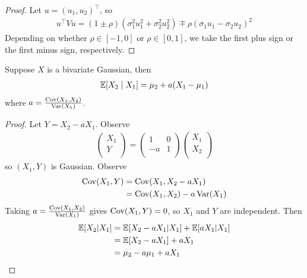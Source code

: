 \documentclass{../../template/note}
\begin{document}
    \begin{proof}
        Let \(u = (u_1, u_2)^\intercal\), so
        \begin{align*}
            u^\intercal V u = (1 \pm \rho)(\sigma_1^2 u_1^2 + \sigma_2^2 u_2^2) \mp \rho(\sigma_1 u_1 - \sigma_2 u_2)^2
        \end{align*}
        Depending on whether \(\rho \in [-1, 0]\) or \(\rho \in [0, 1]\), we take the first plus sign or the first minus sign, respectively.       
    \end{proof}

    \begin{proposition}
        Suppose \(X\) is a bivariate Gaussian, then
        \begin{align*}
            \mathbb E[X_2 \mid X_1] = \mu_2 + a(X_1 - \mu_1)
        \end{align*}
        where \(a = \frac{\operatorname{Cov}(X_1, X_2)}{\operatorname{Var}(X_1)}\).        
    \end{proposition}

    \begin{proof}
        Let \(Y = X_2 - aX_1\). Observe
        \begin{align*}
            \begin{pmatrix}
                X_1 \\
                Y \\
            \end{pmatrix} = \begin{pmatrix}
                1 & 0 \\
                -a & 1 \\
            \end{pmatrix}\begin{pmatrix}
                X_1 \\
                X_2 \\
            \end{pmatrix} 
        \end{align*}
        so \((X_1, Y)\) is Gaussian. Observe
        \begin{align*}
            \operatorname{Cov}(X_1, Y) &= \operatorname{Cov}(X_1, X_2 - aX_1) \\
            &= \operatorname{Cov}(X_1, X_2) - a\operatorname{Var}(X_1)
        \end{align*}
        Taking \(a = \frac{\operatorname{Cov}(X_1, X_2)}{\operatorname{Var}(X_1)}\) gives \(\operatorname{Cov}(X_1, Y) = 0\), so \(X_1\) and \(Y\) are independent. Then
        \begin{align*}
            \mathbb E[X_2 | X_1] &= \mathbb E[X_2 - aX_1 | X_1] + \mathbb E[aX_1 | X_1]\\
            &= \mathbb E[X_2 - aX_1] + aX_1 \\
            &= \mu_2 - a\mu_1 + aX_1
        \end{align*}
    \end{proof}
    
\end{document}
